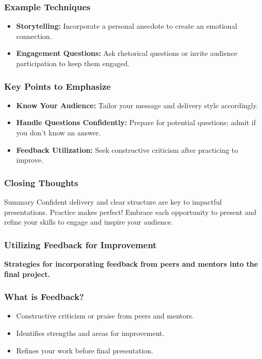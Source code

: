 \documentclass[aspectratio=169]{beamer}
\begin{document}
\begin{frame}[fragile]
    \frametitle{Example Techniques}
    
    \begin{itemize}
        \item \textbf{Storytelling:} Incorporate a personal anecdote to create an emotional connection.
        \item \textbf{Engagement Questions:} Ask rhetorical questions or invite audience participation to keep them engaged.
    \end{itemize}
\end{frame}

\begin{frame}[fragile]
    \frametitle{Key Points to Emphasize}
    
    \begin{itemize}
        \item \textbf{Know Your Audience:} Tailor your message and delivery style accordingly.
        \item \textbf{Handle Questions Confidently:} Prepare for potential questions; admit if you don’t know an answer.
        \item \textbf{Feedback Utilization:} Seek constructive criticism after practicing to improve.
    \end{itemize}
\end{frame}

\begin{frame}[fragile]
    \frametitle{Closing Thoughts}
    
    \begin{block}{Summary}
        Confident delivery and clear structure are key to impactful presentations. Practice makes perfect! Embrace each opportunity to present and refine your skills to engage and inspire your audience.
    \end{block}
\end{frame}

\begin{frame}[fragile]
    \frametitle{Utilizing Feedback for Improvement}
    \textbf{Strategies for incorporating feedback from peers and mentors into the final project.}
\end{frame}

\begin{frame}[fragile]
    \frametitle{What is Feedback?}
    \begin{itemize}
        \item Constructive criticism or praise from peers and mentors.
        \item Identifies strengths and areas for improvement.
        \item Refines your work before final presentation.
    \end{itemize}
\end{frame}
\end{document}
